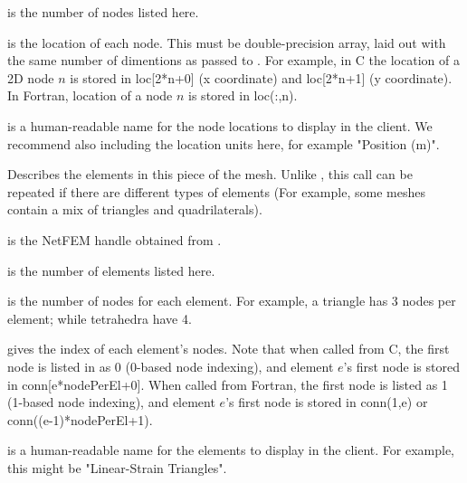 \documentclass[10pt]{article}
\begin{document}
 is the number of nodes listed here.

 is the location of each node.  This must be double-precision
array, laid out with the same number of dimentions as passed to 
.  For example, in C the location of a 2D
node $n$ is stored in loc[2*n+0] (x coordinate) and loc[2*n+1]
(y coordinate).  In Fortran, location of a node $n$ is stored 
in loc(:,n).

 is a human-readable name for the node locations
to display in the client.  We recommend also including the location
units here, for example "Position (m)".



Describes the elements in this piece of the mesh.
Unlike , this call can be repeated
if there are different types of elements (For example, 
some meshes contain a mix of triangles and quadrilaterals).

 is the NetFEM handle obtained from .

 is the number of elements listed here.

 is the number of nodes for each element.
For example, a triangle has 3 nodes per element; while 
tetrahedra have 4.

 gives the index of each element's nodes.  Note
that when called from C, the first node is listed in 
 as 0 (0-based node indexing), and element $e$'s
first node is stored in conn[e*nodePerEl+0].
When called from Fortran, the first node is listed as 1 
(1-based node indexing), and element $e$'s first node is
stored in conn(1,e) or conn((e-1)*nodePerEl+1).

 is a human-readable name for the elements
to display in the client.  For example, this might be
"Linear-Strain Triangles".



\end{document}
